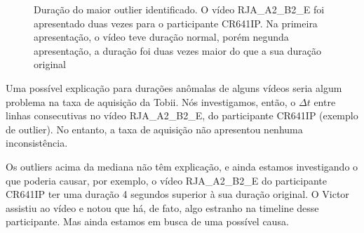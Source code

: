 \documentclass{article}
\begin{document}
\begin{figure}[]
  \caption{Duração do maior outlier identificado. O vídeo RJA\_A2\_B2\_E foi apresentado duas vezes para o participante CR641IP. Na primeira apresentação, o vídeo teve duração normal, porém negunda apresentação, a duração foi duas vezes maior do que a sua duração original}
  \noindent{}
  \centering
\end{figure}

Uma possível explicação para durações anômalas de alguns vídeos seria algum problema na taxa de aquisição da Tobii. Nós investigamos, então, o $\Delta t$ entre linhas consecutivas no vídeo RJA\_A2\_B2\_E, do participante CR641IP (exemplo de outlier). No entanto, a taxa de aquisição não apresentou nenhuma inconsistência.

Os outliers acima da mediana não têm explicação, e ainda estamos investigando o que poderia causar, por exemplo, o vídeo RJA\_A2\_B2\_E do participante CR641IP ter uma duração 4 segundos superior à sua duração original. O Victor assistiu ao vídeo e notou que há, de fato, algo estranho na timeline desse participante. Mas ainda estamos em busca de uma possível causa.
\end{document}
